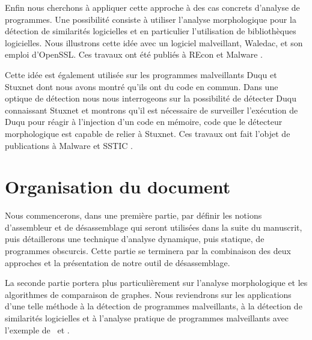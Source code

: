 Enfin nous cherchons à appliquer cette approche à des cas concrets d'analyse de programmes.
Une possibilité consiste à utiliser l'analyse morphologique pour la détection de similarités logicielles et en particulier l'utilisation de bibliothèques logicielles.
Nous illustrons cette idée avec un logiciel malveillant, Waledac, et son emploi d'OpenSSL.
Ces travaux ont été publiés à REcon \cite{REAT12} et Malware \cite{mal12}.

Cette idée est également utilisée sur les programmes malveillants Duqu et Stuxnet dont nous avons montré qu'ils ont du code en commun.
Dans une optique de détection nous nous interrogeons sur la possibilité de détecter Duqu connaissant Stuxnet et montrons qu'il est nécessaire de surveiller l'exécution de Duqu pour réagir à l'injection d'un code en mémoire, code que le détecteur morphologique est capable de relier à Stuxnet.
Ces travaux ont fait l'objet de publications à Malware \cite{mal13} et SSTIC \cite{sstic13}.

\section*{Organisation du document}

Nous commencerons, dans une première partie, par définir les notions d'assembleur et de désassemblage qui seront utilisées dans la suite du manuscrit, puis détaillerons une technique d'analyse dynamique, puis statique, de programmes obscurcis. Cette partie se terminera par la combinaison des deux approches et la présentation de notre outil de désassemblage.

La seconde partie portera plus particulièrement sur l'analyse morphologique et les algorithmes de comparaison de graphes. Nous reviendrons sur les applications d'une telle méthode à la détection de programmes malveillants, à la détection de similarités logicielles et à l'analyse pratique de programmes malveillants avec l'exemple de \duqu\ et \stux.

